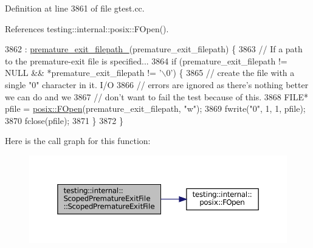 Definition at line 3861 of file gtest.\+cc.



References testing\+::internal\+::posix\+::\+F\+Open().


\begin{DoxyCode}
3862       : \hyperlink{classtesting_1_1internal_1_1ScopedPrematureExitFile_a41f573a197749afb0a2b14b289f7aa62}{premature\_exit\_filepath\_}(premature\_exit\_filepath) \{
3863     \textcolor{comment}{// If a path to the premature-exit file is specified...}
3864     \textcolor{keywordflow}{if} (premature\_exit\_filepath != NULL && *premature\_exit\_filepath != \textcolor{charliteral}{'\(\backslash\)0'}) \{
3865       \textcolor{comment}{// create the file with a single "0" character in it.  I/O}
3866       \textcolor{comment}{// errors are ignored as there's nothing better we can do and we}
3867       \textcolor{comment}{// don't want to fail the test because of this.}
3868       FILE* pfile = \hyperlink{namespacetesting_1_1internal_1_1posix_a4042201dcc4932641d484e7ddf94de7d}{posix::FOpen}(premature\_exit\_filepath, \textcolor{stringliteral}{"w"});
3869       fwrite(\textcolor{stringliteral}{"0"}, 1, 1, pfile);
3870       fclose(pfile);
3871     \}
3872   \}
\end{DoxyCode}
Here is the call graph for this function\+:
\nopagebreak
\begin{figure}[H]
\begin{center}
\leavevmode
\includegraphics[width=350pt]{classtesting_1_1internal_1_1ScopedPrematureExitFile_ae520883b8a6984a864ce675acedff4a2_cgraph}
\end{center}
\end{figure}
\mbox{\label{classtesting_1_1internal_1_1ScopedPrematureExitFile_afa2ddc9bc1c2a90fd0dd82bb11fddc79}} 
